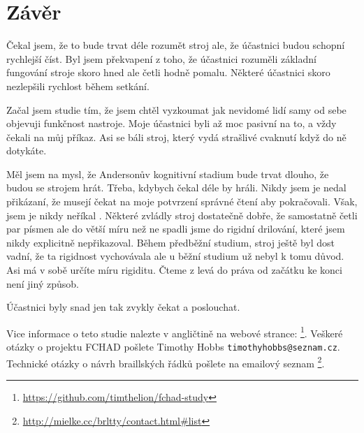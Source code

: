 \chapter{Závěr}
Čekal jsem, že to bude trvat déle rozumět stroj ale, že účastnici budou schopní rychlejší číst. Byl jsem překvapení z toho, že účastnici rozuměli základní fungování stroje skoro hned ale četli hodně pomalu. Některé účastnici skoro nezlepšili rychlost během setkání.

Začal jsem studie tím, že jsem chtěl vyzkoumat jak nevidomé lidí samy od sebe objevuji funkčnost nastroje. Moje účastnici byli až moc pasivní na to, a vždy čekali na můj příkaz. Asi se báli stroj, který vydá strašlivé cvaknutí když do ně dotykáte.

Měl jsem na mysl, že Andersonův kognitivní stadium bude trvat dlouho, že budou se strojem hrát. Třeba, kdybych čekal déle by hráli. Nikdy jsem je nedal přikázaní, že musejí čekat na moje potvrzení správné čtení aby pokračovali. Však, jsem je nikdy neříkal . Některé zvládly stroj dostatečně dobře, že samostatně četli par písmen ale do větší míru než ne spadli jsme do rigidní drilování, které jsem nikdy explicitně nepřikazoval. Během předběžní studium, stroj ještě byl dost vadní, že ta rigidnost vychovávala ale u běžní studium už nebyl k tomu důvod. Asi  má v sobě určíte míru rigiditu. Čteme z levá do práva od začátku ke konci není jiný způsob.

Účastnici byly snad jen tak zvykly čekat a poslouchat.




Vice informace o teto studie nalezte v angličtině na webové strance: \footnote{\url{https://github.com/timthelion/fchad-study}}.  Veškeré otázky o projektu FCHAD pošlete Timothy Hobbs {\tt timothyhobbs@seznam.cz}.  Technické otázky o návrh braillských řádků pošlete na emailový seznam
\footnote{\url{ http://mielke.cc/brltty/contact.html#list}}.


